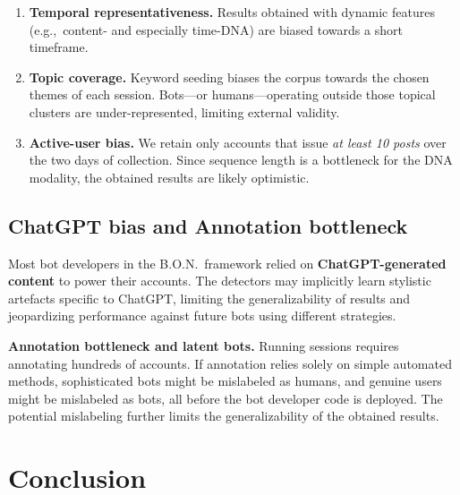 \documentclass[conference]{IEEEtran}
\begin{document}
    \begin{enumerate}
      \item \textbf{Temporal representativeness.}
            Results obtained with dynamic features (e.g.,\ content- and especially time-DNA) 
            are biased towards a short timeframe.
    
      \item \textbf{Topic coverage.}
            Keyword seeding biases the corpus towards
            the chosen themes of each session.
            Bots—or humans—operating outside those
            topical clusters are under-represented,
            limiting external validity.
    
      \item \textbf{Active-user bias.}
            We retain only accounts that issue
            \emph{at least 10 posts} over the two days of collection.
            Since sequence length is a bottleneck 
            for the DNA modality, the obtained results
            are likely optimistic.
    \end{enumerate}

    \subsection{ChatGPT bias and Annotation bottleneck}
    Most bot developers in the B.O.N.\ framework relied on
    \textbf{ChatGPT-generated content} to power their accounts.
    The detectors may implicitly learn stylistic artefacts
    specific to ChatGPT, limiting the generalizability 
    of results and jeopardizing performance against
    future bots using different strategies.

    \textbf{Annotation bottleneck and latent bots.}
    Running sessions requires annotating hundreds of accounts.
    If annotation relies solely on simple automated methods, 
    sophisticated bots might be mislabeled as humans, 
    and genuine users might be mislabeled as bots,
    all before the bot developer code is deployed. 
    The potential mislabeling further limits the generalizability of the obtained results. 
\section{Conclusion} \label{sec:conclusion}
\end{document}
